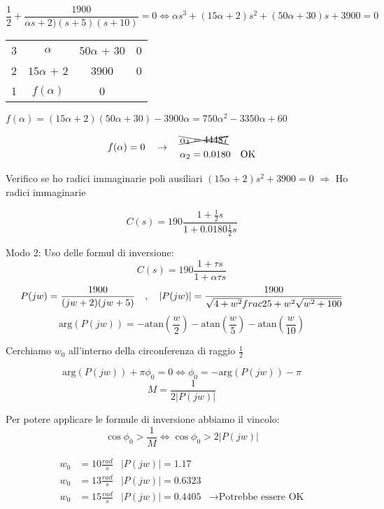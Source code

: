 \documentclass{article}
\begin{document}
\[ \frac{1}{2} + \frac{1900}{\alpha s + 2)(s + 5) (s+10)} = 0 \Leftrightarrow \alpha s^3 + (15 \alpha + 2)s^2 + (50 \alpha + 30) s + 3900 = 0 \]

\begin{minipage}{0.30\textwidth}
\begin{tabular}{c| c c c}
    3 & $\alpha$ & $50\alpha$ + 30 & 0\\
    2 & $15\alpha$ + 2 & 3900 & 0\\
    1 & $f(\alpha)$ & 0
\end{tabular}
\end{minipage}
\begin{minipage}{0.65\textwidth}
    $ f(\alpha) = (15 \alpha + 2) ( 50 \alpha + 30) - 3900\alpha = 750\alpha^2 - 3350\alpha + 60 $
\end{minipage}

\[
    f(\alpha) = 0
    \quad\rightarrow\quad
    \begin{aligned}
        &\xcancel{\alpha_1 = 44487}\\
        &\alpha_2 = 0.0180 \quad \text{OK}
    \end{aligned}
\]

Verifico se ho radici immaginarie poli ausiliari $(15 \alpha + 2) s^2 + 3900 = 0$ $\Rightarrow$ Ho radici immaginarie

\[C(s) = 190 \frac{1 + \frac{1}{2}s}{1 + 0.0180 \frac{1}{2} s}\]

Modo 2: Uso delle formul di inversione:
\[ C(s) = 190 \frac{1 + \tau s}{1 + \alpha \tau s}\]
\[ P(jw) = \frac{1900}{(jw + 2)(jw+5) } \quad , \quad |P(jw)| = \frac{1900}{\sqrt{4 + w^2}\\frac{25 + w^2}\sqrt{w^2 + 100}} \]
\[ \text{arg}(P(jw)) = - \text{atan}\left(\frac{w}{2}\right) - \text{atan}\left(\frac{w}{5}\right) -\text{atan}\left(\frac{w}{10}\right)\]

Cerchiamo $w_0$ all'interno della circonferenza di raggio $\frac{1}{2}$

\[ \text{arg}(P(jw)) + \pi \phi_0 = 0 \Leftrightarrow \phi_0 = -\text{arg}(P(jw)) -\pi \]
\[ M = \frac{1}{2 |P(jw)|} \]

Per potere applicare le formule di inversione abbiamo il vincolo:
\[ \cos \phi_0 > \frac{1}{M} \Leftrightarrow \cos \phi_0 > 2 |P(jw)| \]

\[
\begin{aligned}
    w_0 &= 10 \frac{rad}{s} & |P(jw)| = 1.17\\
    w_0 &=13 \frac{rad}{s} & |P(jw)| = 0.6323\\
    w_0 &= 15\frac{rad}{s} & |P(jw)| = 0.4405& \rightarrow \text{Potrebbe essere OK}
\end{aligned}
\]
\end{document}
